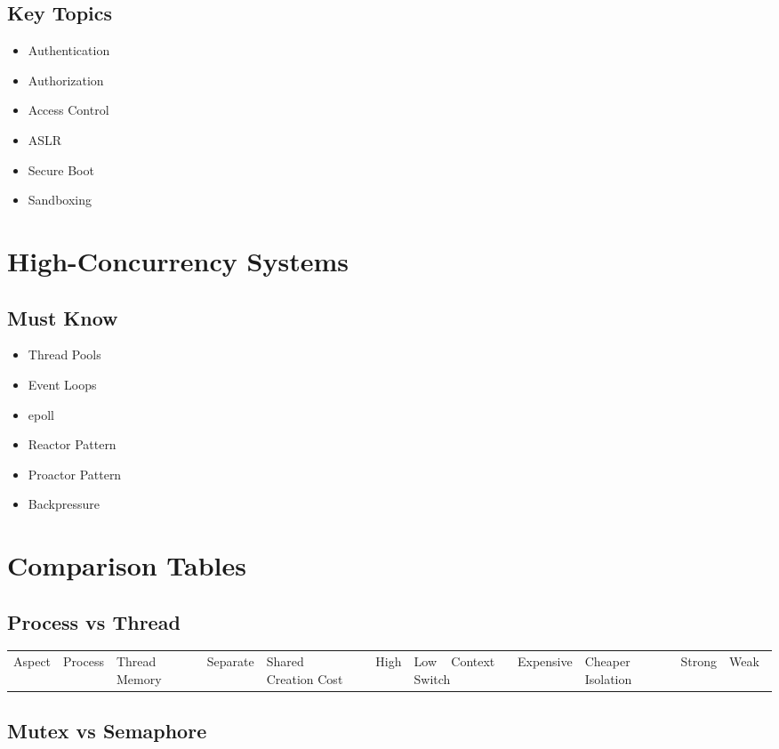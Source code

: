 \subsection*{Key Topics}

\begin{itemize}
\item Authentication
\item Authorization
\item Access Control
\item ASLR
\item Secure Boot
\item Sandboxing
\end{itemize}

\section{High-Concurrency Systems}

\subsection*{Must Know}

\begin{itemize}
\item Thread Pools
\item Event Loops
\item epoll
\item Reactor Pattern
\item Proactor Pattern
\item Backpressure
\end{itemize}

\section{Comparison Tables}

\subsection*{Process vs Thread}

\begin{longtable}{|p{4cm}|p{5cm}|p{5cm}|}
\hline
Aspect & Process & Thread \
\hline
Memory & Separate & Shared \
\hline
Creation Cost & High & Low \
\hline
Context Switch & Expensive & Cheaper \
\hline
Isolation & Strong & Weak \
\hline
\end{longtable}

\subsection*{Mutex vs Semaphore}

